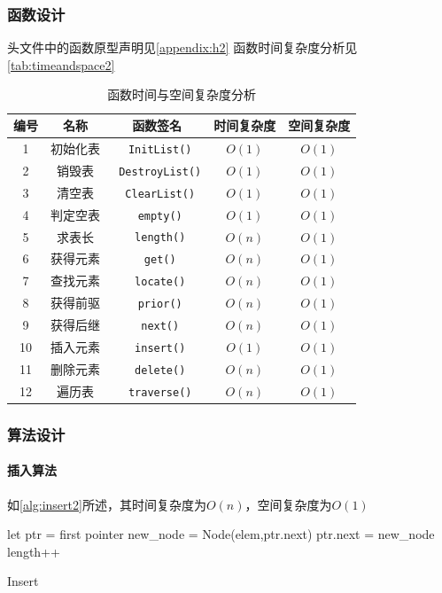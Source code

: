 \subsubsection{函数设计}
头文件中的函数原型声明见\autoref{appendix:h2}
函数时间复杂度分析见\autoref{tab:timeandspace2}
\begin{table}[h]
\centering
\caption{函数时间与空间复杂度分析}
\label{tab:timeandspace2}
\begin{tabular}{@{}ccccc@{}}
\toprule
编号                          & 名称  & 函数签名 & 时间复杂度 & 空间复杂度 \\ \toprule
    \multicolumn{1}{c|}{1}  & 初始化表 & \texttt{ InitList()} & $O(1)$ &  $O(1)$ \\
    \multicolumn{1}{c|}{2}  & 销毁表& \texttt{ DestroyList()} & $O(1)$ &  $O(1)$ \\
    \multicolumn{1}{c|}{3}  & 清空表& \texttt{ ClearList()} & $O(1)$ &  $O(1)$   \\
    \multicolumn{1}{c|}{4}  & 判定空表& \texttt{ empty()} & $O(1)$ &  $O(1)$     \\
    \multicolumn{1}{c|}{5}  & 求表长 & \texttt{ length()} & $O(n)$ &  $O(1)$     \\
    \multicolumn{1}{c|}{6}  & 获得元素 & \texttt{ get()} & $O(n)$ &  $O(1)$      \\
    \multicolumn{1}{c|}{7}  & 查找元素 & \texttt{ locate()} & $O(n)$ &  $O(1)$   \\
    \multicolumn{1}{c|}{8}  & 获得前驱 & \texttt{ prior()} & $O(n)$ &  $O(1)$    \\
    \multicolumn{1}{c|}{9}  & 获得后继 & \texttt{ next()} & $O(n)$ &  $O(1)$     \\
    \multicolumn{1}{c|}{10}  & 插入元素 & \texttt{ insert()} & $O(1)$ &  $O(1)$  \\
    \multicolumn{1}{c|}{11}  & 删除元素 & \texttt{ delete()} & $O(n)$ &  $O(1)$  \\
    \multicolumn{1}{c|}{12}  & 遍历表 & \texttt{ traverse()}   & $O(n)$ & $O(1)$ \\ \bottomrule
\end{tabular}
\end{table}
\subsubsection{算法设计}
\paragraph{插入算法}如\autoref{alg:insert2}所述，其时间复杂度为$O(n)$，空间复杂度为$O(1)$
\par
\begin{algorithm}[H]
    \SetAlgoLined
    let ptr = first pointer\;
    new\_node = Node(elem,ptr.next)\;
    ptr.next = new\_node\;
    length++
\caption{Insert}\label{alg:insert2}
\end{algorithm}
